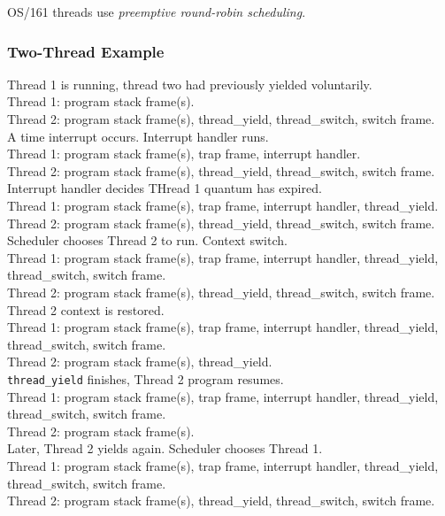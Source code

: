 \documentclass[12pt]{article}
\theoremstyle{plain}
\theoremstyle{definition}
\begin{document}
OS/161 threads use \emph{preemptive round-robin scheduling}.

\subsubsection{Two-Thread Example}
Thread 1 is running, thread two had previously yielded voluntarily. \\
Thread 1: program stack frame(s). \\
Thread 2: program stack frame(s), thread\_yield, thread\_switch, switch frame. \\

A time interrupt occurs. Interrupt handler runs. \\
Thread 1: program stack frame(s), trap frame, interrupt handler. \\
Thread 2: program stack frame(s), thread\_yield, thread\_switch, switch frame. \\

Interrupt handler decides THread 1 quantum has expired. \\
Thread 1: program stack frame(s), trap frame, interrupt handler, thread\_yield. \\
Thread 2: program stack frame(s), thread\_yield, thread\_switch, switch frame. \\

Scheduler chooses Thread 2 to run. Context switch. \\
Thread 1: program stack frame(s), trap frame, interrupt handler, thread\_yield, thread\_switch, switch frame. \\
Thread 2: program stack frame(s), thread\_yield, thread\_switch, switch frame. \\

Thread 2 context is restored. \\
Thread 1: program stack frame(s), trap frame, interrupt handler, thread\_yield, thread\_switch, switch frame. \\
Thread 2: program stack frame(s), thread\_yield. \\

\texttt{thread\_yield} finishes, Thread 2 program resumes. \\
Thread 1: program stack frame(s), trap frame, interrupt handler, thread\_yield, thread\_switch, switch frame. \\
Thread 2: program stack frame(s). \\

Later, Thread 2 yields again. Scheduler chooses Thread 1. \\
Thread 1: program stack frame(s), trap frame, interrupt handler, thread\_yield, thread\_switch, switch frame. \\
Thread 2: program stack frame(s), thread\_yield, thread\_switch, switch frame. \\
\end{document}
